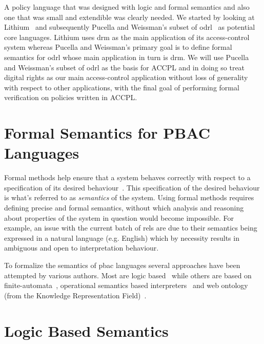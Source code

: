 \documentclass[runningheads,a4paper]{llncs}
\begin{document}
A policy language that was designed with logic and formal semantics and also one that was small and extendible was clearly needed. We started by looking at Lithium~\cite{Halpern2008} and subsequently Pucella and Weissman's subset of \ac{odrl}~\cite{pucella2006} as potential core languages. Lithium uses \ac{drm} as the main application of its access-control system whereas Pucella and Weissman's primary goal is to define formal semantics for \ac{odrl} whose main application in turn is \ac{drm}. We will use Pucella and Weissman's subset of \ac{odrl} as the basis for \ac{ACCPL} and in doing so treat digital rights as our main access-control application without loss of generality with respect to other applications, with the final goal of performing formal verification on policies written in \ac{ACCPL}.



\section{Formal Semantics for PBAC Languages}


Formal methods help ensure that a system behaves correctly with respect to a specification of its desired behaviour~\cite{TAPL}. This specification of the desired behaviour is what's referred to as \emph{semantics} of the system. Using formal methods requires defining precise and formal semantics, without which analysis and reasoning about properties of the system in question would become impossible. For example, an issue with the current batch of \ac{rel}s are due to their semantics being expressed in a natural language (e.g. English) which by necessity results in ambiguous and open to interpretation behaviour. 

To formalize the semantics of \ac{pbac} languages several approaches have been attempted by various authors. Most are logic based~\cite{Halpern2008,pucella2006} while others are based on finite-automata~\cite{Holzer}, operational semantics based interpreters~\cite{Safavi-naini} and web ontology (from the Knowledge Representation Field)~\cite{Kasten2010MTS}. 


\section{Logic Based Semantics}

\end{document}
